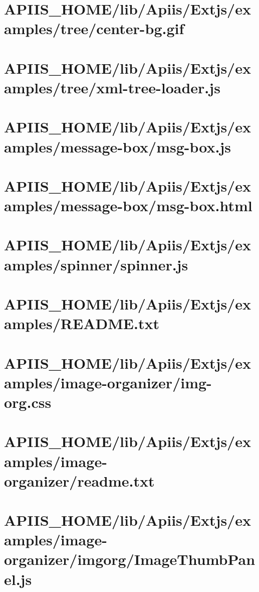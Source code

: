 \section{APIIS\_HOME/lib/Apiis/Extjs/examples/tree/center-bg.gif} 
\section{APIIS\_HOME/lib/Apiis/Extjs/examples/tree/xml-tree-loader.js} 
\section{APIIS\_HOME/lib/Apiis/Extjs/examples/message-box/msg-box.js} 
\section{APIIS\_HOME/lib/Apiis/Extjs/examples/message-box/msg-box.html} 
\section{APIIS\_HOME/lib/Apiis/Extjs/examples/spinner/spinner.js} 
\section{APIIS\_HOME/lib/Apiis/Extjs/examples/README.txt} 
\section{APIIS\_HOME/lib/Apiis/Extjs/examples/image-organizer/img-org.css} 
\section{APIIS\_HOME/lib/Apiis/Extjs/examples/image-organizer/readme.txt} 
\section{APIIS\_HOME/lib/Apiis/Extjs/examples/image-organizer/imgorg/ImageThumbPanel.js} 
